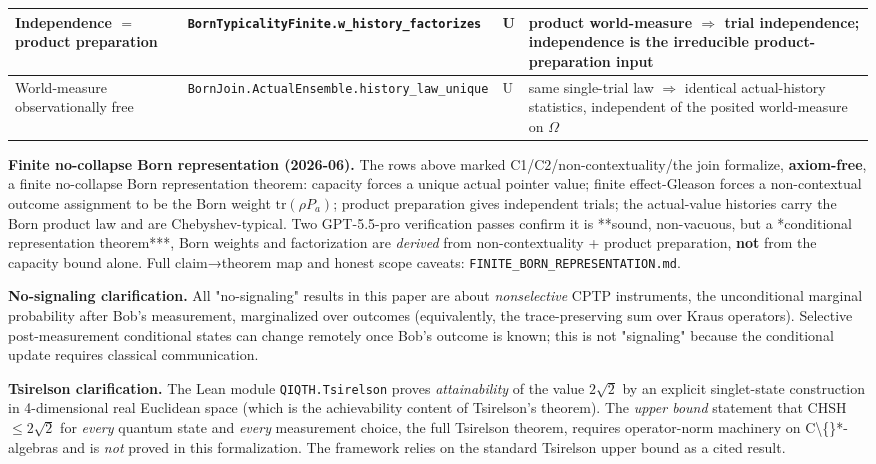 \documentclass[11pt,a4paper]{article}
\begin{document}
\begin{center}
\begin{tabularx}{\linewidth}{|Y|Y|Y|Y|}
\hline
Independence $=$ product preparation & \texttt{BornTypicalityFinite.w\_history\_factorizes} & U & product world-measure $\Rightarrow$ trial independence; independence is the irreducible product-preparation input \\
\hline
World-measure observationally free & \texttt{BornJoin.ActualEnsemble.history\_law\_unique} & U & same single-trial law $\Rightarrow$ identical actual-history statistics, independent of the posited world-measure on $\Omega$ \\
\hline
\end{tabularx}
\end{center}

\textbf{Finite no-collapse Born representation (2026-06).} The rows above marked C1/C2/non-contextuality/the
join formalize, \textbf{axiom-free}, a finite no-collapse Born representation theorem: capacity forces a
unique actual pointer value; finite effect-Gleason forces a non-contextual outcome assignment to be the
Born weight $\mathrm{tr}(\rho P_a)$; product preparation gives independent trials; the actual-value
histories carry the Born product law and are Chebyshev-typical. Two GPT-5.5-pro verification passes
confirm it is **sound, non-vacuous, but a *conditional representation theorem***, Born weights and
factorization are \emph{derived} from non-contextuality + product preparation, \textbf{not} from the capacity
bound alone. Full claim→theorem map and honest scope caveats: \texttt{FINITE\_BORN\_REPRESENTATION.md}.

\textbf{No-signaling clarification.} All "no-signaling" results in this paper are about \emph{nonselective} CPTP instruments, the unconditional marginal probability after Bob's measurement, marginalized over outcomes (equivalently, the trace-preserving sum over Kraus operators). Selective post-measurement conditional states can change remotely once Bob's outcome is known; this is not "signaling" because the conditional update requires classical communication.

\textbf{Tsirelson clarification.} The Lean module \texttt{QIQTH.Tsirelson} proves \emph{attainability} of the value $2\sqrt{2}$ by an explicit singlet-state construction in 4-dimensional real Euclidean space (which is the achievability content of Tsirelson's theorem). The \emph{upper bound} statement that CHSH $\le 2\sqrt{2}$ for \emph{every} quantum state and \emph{every} measurement choice, the full Tsirelson theorem, requires operator-norm machinery on C\textbackslash\{\}*-algebras and is \emph{not} proved in this formalization. The framework relies on the standard Tsirelson upper bound as a cited result.
\end{document}
